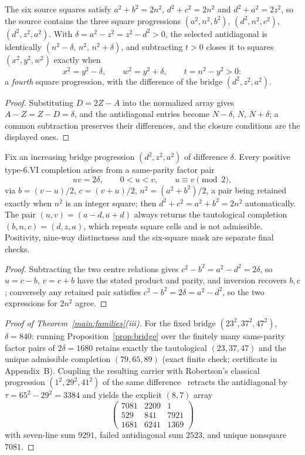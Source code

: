 \begin{proposition}\label{prop:fourap}
The six source squares satisfy $a^2+b^2=2n^2$, $d^2+c^2=2n^2$ and
$d^2+a^2=2z^2$, so the source contains the three square progressions
$(a^2,n^2,b^2)$, $(d^2,n^2,c^2)$, $(d^2,z^2,a^2)$. With
$\delta=a^2-z^2=z^2-d^2>0$, the selected antidiagonal is identically
$(n^2-\delta,\,n^2,\,n^2+\delta)$, and subtracting $t>0$ closes it to
squares $(x^2,y^2,w^2)$ exactly when
\[
x^2=y^2-\delta,\qquad w^2=y^2+\delta,\qquad t=n^2-y^2>0:
\]
a \emph{fourth} square progression, with the difference of the bridge
$(d^2,z^2,a^2)$.
\end{proposition}

\begin{proof}
Substituting $D=2Z-A$ into the normalized array gives $A-Z=Z-D=\delta$, and
the antidiagonal entries become $N-\delta$, $N$, $N+\delta$; a common
subtraction preserves their differences, and the closure conditions are the
displayed ones.
\end{proof}

\begin{proposition}\label{prop:bridge}
Fix an increasing bridge progression $(d^2,z^2,a^2)$ of difference
$\delta$. Every positive type-6.VI completion arises from a same-parity
factor pair
\[
uv=2\delta,\qquad 0<u<v,\qquad u\equiv v\pmod 2,
\]
via $b=(v-u)/2$, $c=(v+u)/2$, $n^2=(a^2+b^2)/2$, a pair being retained
exactly when $n^2$ is an integer square; then $d^2+c^2=a^2+b^2=2n^2$
automatically. The pair $(u,v)=(a-d,a+d)$ always returns the tautological
completion $(b,n,c)=(d,z,a)$, which repeats square cells and is not
admissible. Positivity, nine-way distinctness and the six-square mask are
separate final checks.
\end{proposition}

\begin{proof}
Subtracting the two centre relations gives $c^2-b^2=a^2-d^2=2\delta$, so
$u=c-b$, $v=c+b$ have the stated product and parity, and inversion recovers
$b,c$; conversely any retained pair satisfies $c^2-b^2=2\delta=a^2-d^2$, so
the two expressions for $2n^2$ agree.
\end{proof}

\begin{proof}[Proof of Theorem~\ref{main:families}(iii)]
For the fixed bridge $(23^2,37^2,47^2)$, $\delta=840$: running
Proposition~\ref{prop:bridge} over the finitely many same-parity factor
pairs of $2\delta=1680$ retains exactly the tautological $(23,37,47)$ and
the unique admissible completion $(79,65,89)$ (exact finite check;
certificate in Appendix~B). Coupling the resulting carrier with Robertson's
classical progression $(1^2,29^2,41^2)$ of the same
difference~\cite{ROB96} retracts the antidiagonal by $\tau=65^2-29^2=3384$
and yields the explicit $(8,7)$ array
\[
\begin{pmatrix}
7081 & 2209 & 1\\
529 & 841 & 7921\\
1681 & 6241 & 1369
\end{pmatrix}
\]
with seven-line sum $9291$, failed antidiagonal sum $2523$, and unique
nonsquare $7081$.
\end{proof}

